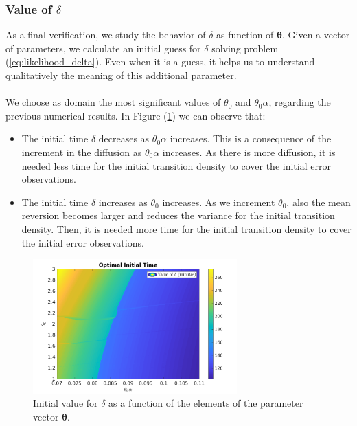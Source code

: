\documentclass[11pt]{article}
\theoremstyle{definition}
\begin{document}
\subsubsection{Value of $\delta$}
As a final verification, we study the behavior of $\delta$ as function of $\bm{\theta}$. Given a vector of parameters, we calculate an initial guess for $\delta$ solving problem (\ref{eq:likelihood_delta}). Even when it is a guess, it helps us to understand qualitatively the meaning of this additional parameter.\\
\quad\\
We choose as domain the most significant values of $\theta_0$ and $\theta_0\alpha$, regarding the previous numerical results. In Figure (\ref{fig:delta}) we can observe that:
\begin{itemize}
\item The initial time $\delta$ decreases as $\theta_0\alpha$ increases. This is a consequence of the increment in the diffusion as $\theta_0\alpha$ increases. As there is more diffusion, it is needed less time for the initial transition density to cover the initial error observations.
\item The initial time $\delta$ increases as $\theta_0$ increases. As we increment $\theta_0$, also the mean reversion becomes larger and reduces the variance for the initial transition density. Then, it is needed more time for the initial transition density to cover the initial error observations.
\end{itemize}

\begin{figure}[H]
\centering
\includegraphics[width=0.7\textwidth]{../../MATLAB_Files/Results/delta/contour_delta.png}
\caption{Initial value for $\delta$ as a function of the elements of the parameter vector $\bm{\theta}$.}
\label{fig:delta}
\end{figure}

\end{document}
